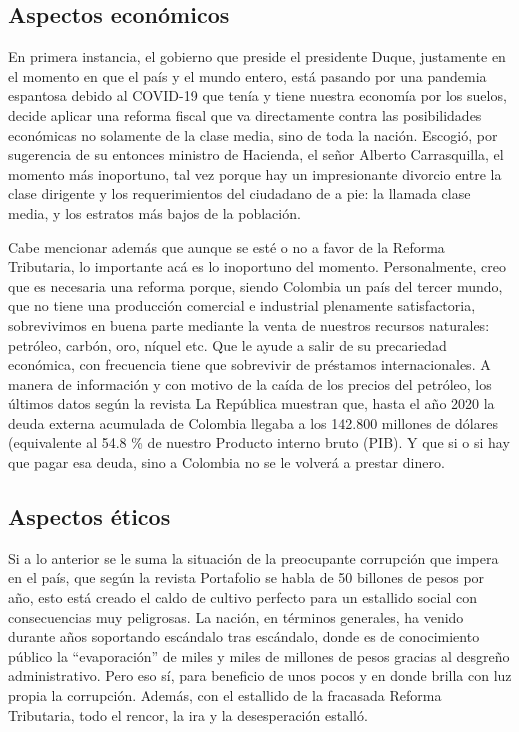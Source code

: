 \documentclass[doc, 12pt, letterpaper, donotrepeattitle, floatsintext, apacite]{apa6}    %
\begin{document}
\subsection{Aspectos económicos} 
En primera instancia, el gobierno que preside el presidente Duque, justamente en el momento en que el país y el mundo entero, está pasando por una pandemia espantosa debido al COVID-19 que tenía y tiene nuestra economía por los suelos, decide aplicar una reforma fiscal que va directamente contra las posibilidades económicas no solamente de la clase media, sino de toda la nación. Escogió, por sugerencia de su entonces ministro de Hacienda, el señor Alberto Carrasquilla, el momento más inoportuno, tal vez porque hay un impresionante divorcio entre la clase dirigente y los requerimientos del ciudadano de a pie: la llamada clase media, y los estratos más bajos de la población.

Cabe mencionar además que aunque se esté o no a favor de la Reforma Tributaria, lo importante acá es lo inoportuno del momento. Personalmente, creo que es necesaria una reforma porque, siendo Colombia un país del tercer mundo, que no tiene una producción comercial e industrial plenamente satisfactoria, sobrevivimos en buena parte mediante la venta de nuestros recursos naturales: petróleo, carbón, oro, níquel etc. Que le ayude a salir de su precariedad económica, con frecuencia tiene que sobrevivir de préstamos internacionales. A manera de información y con motivo de la caída de los precios del petróleo, los últimos datos según la revista La República muestran que, hasta el año 2020 la deuda externa acumulada de Colombia llegaba a los 142.800 millones de dólares (equivalente al 54.8
\% de nuestro Producto interno bruto (PIB). Y que si o si hay que pagar esa deuda, sino a Colombia no se le volverá a prestar dinero.

\subsection{Aspectos éticos}
Si a lo anterior se le suma la situación de la preocupante corrupción que impera en el país, que según la revista Portafolio se habla de 50 billones de pesos por año, esto está creado el caldo de cultivo perfecto para un estallido social con consecuencias muy peligrosas. La nación, en términos generales, ha venido durante años soportando escándalo tras escándalo, donde es de conocimiento público la “evaporación” de miles y miles de millones de pesos gracias al desgreño administrativo. Pero eso sí, para beneficio de unos pocos y en donde brilla con luz propia la corrupción. Además, con el estallido de la fracasada Reforma Tributaria, todo el rencor, la ira y la desesperación estalló.
\end{document}
